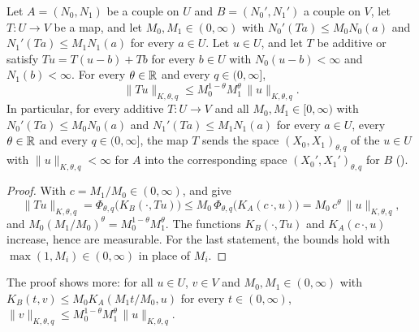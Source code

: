 \begin{theorem}
\label{thm:interpolation-property}
\leanok
{}
Let $A = (N_0, N_1)$ be a couple on $U$ and $B = (N_0', N_1')$ a couple on $V$, let
$T : U \to V$ be a map, and let $M_0, M_1 \in (0, \infty)$ with $N_0'(Ta) \leq M_0 N_0(a)$ and
$N_1'(Ta) \leq M_1 N_1(a)$ for every $a \in U$. Let $u \in U$, and let $T$ be additive or satisfy
$Tu = T(u - b) + Tb$ for every $b \in U$ with $N_0(u - b) < \infty$ and $N_1(b) < \infty$. For
every $\theta \in \mathbb{R}$ and every $q \in (0, \infty]$,
\[
  \|Tu\|_{K, \theta, q} \leq M_0^{1-\theta} M_1^{\theta} \, \|u\|_{K, \theta, q} .
\]
In particular, for every additive $T : U \to V$ and all $M_0, M_1 \in [0, \infty)$ with
$N_0'(Ta) \leq M_0 N_0(a)$ and $N_1'(Ta) \leq M_1 N_1(a)$ for every $a \in U$, every
$\theta \in \mathbb{R}$ and every $q \in (0, \infty]$, the map $T$ sends the space
$(X_0, X_1)_{\theta, q}$ of the $u \in U$ with $\|u\|_{K, \theta, q} < \infty$ for $A$ into the
corresponding space $(X_0', X_1')_{\theta, q}$ for $B$ ().
\end{theorem}

\begin{proof}
\leanok
With $c = M_1 / M_0 \in (0, \infty)$,  and
 give
\[
  \|Tu\|_{K, \theta, q} = \Phi_{\theta, q}\bigl(K_B(\cdot, Tu)\bigr)
  \leq M_0 \, \Phi_{\theta, q}\bigl(K_A(c \, \cdot, u)\bigr)
  = M_0 \, c^{\theta} \, \|u\|_{K, \theta, q} ,
\]
and $M_0 (M_1 / M_0)^{\theta} = M_0^{1-\theta} M_1^{\theta}$. The functions $K_B(\cdot, Tu)$ and
$K_A(c \, \cdot, u)$ increase, hence are measurable. For the last statement, the bounds hold with
$\max(1, M_i) \in (0, \infty)$ in place of $M_i$.
\end{proof}

The proof shows more: for all $u \in U$, $v \in V$ and $M_0, M_1 \in (0, \infty)$ with
$K_B(t, v) \leq M_0 K_A(M_1 t / M_0, u)$ for every $t \in (0, \infty)$,
$\|v\|_{K, \theta, q} \leq M_0^{1-\theta} M_1^{\theta} \, \|u\|_{K, \theta, q}$.

